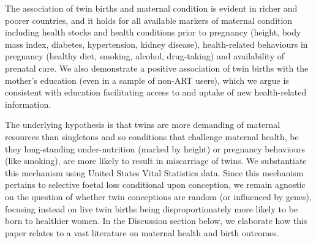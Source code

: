 \documentclass[11pt]{article}
\begin{document}
The association of twin births and maternal condition is evident in richer and poorer countries, and it holds for all available markers of maternal condition including health stocks and health conditions prior to pregnancy (height, body mass index, diabetes, hypertension, kidney disease), health-related behaviours in pregnancy (healthy diet, smoking, alcohol, drug-taking) and availability of prenatal care. We also demonstrate a positive association of twin births with the mother's education (even in a sample of non-ART users), which we argue is consistent with education facilitating access to and uptake of new health-related information\cite{Kenkel1991,CutlerLlerasMuney2010}. 

The underlying hypothesis is that twins are more demanding of maternal resources than singletons and so conditions that challenge maternal health, be they long-standing under-nutrition (marked by height) or pregnancy behaviours (like smoking), are more likely to result in miscarriage of twins. We substantiate this mechanism using United States Vital Statistics data. Since this mechanism pertains to selective foetal loss conditional upon conception, we remain agnostic on the question of whether twin conceptions are random (or influenced by genes), focusing instead on live twin births being disproportionately more likely to be born to healthier women. In the Discussion section below, we elaborate how this paper relates to a vast literature on maternal health and birth outcomes.
\end{document}
